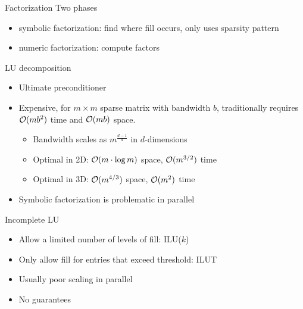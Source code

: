 \begin{frame}[shrink=5]{Factorization}
  Two phases
  \begin{itemize}
  \item symbolic factorization: find where fill occurs, only uses sparsity pattern
  \item numeric factorization: compute factors
  \end{itemize}
  \begin{block}{LU decomposition}
    \begin{itemize}
    \item Ultimate preconditioner
    \item Expensive, for $m\times m$ sparse matrix with bandwidth $b$, traditionally requires $\mathcal{O}(mb^2)$ time and $\mathcal{O}(mb)$ space.
      \begin{itemize}
      \item Bandwidth scales as $m^{\frac{d-1}{d}}$ in $d$-dimensions
      \item Optimal in 2D: $\mathcal{O}(m \cdot \log m)$ space, $\mathcal{O}(m^{3/2})$ time
      \item Optimal in 3D: $\mathcal{O}(m^{4/3})$ space, $\mathcal{O}(m^2)$ time
      \end{itemize}
    \item Symbolic factorization is problematic in parallel
    \end{itemize}
  \end{block}
  \begin{block}{Incomplete LU}
    \begin{itemize}
    \item Allow a limited number of levels of fill:
      ILU($k$)
    \item Only allow fill for entries that exceed threshold: ILUT
    \item Usually poor scaling in parallel
    \item No guarantees
    \end{itemize}
  \end{block}
\end{frame}

